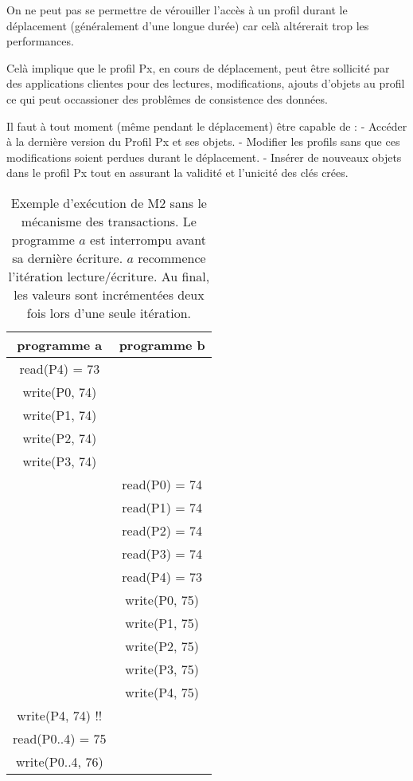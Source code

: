 \documentclass[a4paper,11pt]{article}
\begin{document}
On ne peut pas se permettre de vérouiller l'accès à un profil durant le déplacement (généralement d'une longue durée) car celà altérerait trop les performances.

Celà implique que le profil Px, en cours de déplacement, peut être sollicité par des applications clientes pour des lectures, modifications, ajouts d'objets au profil ce qui peut occassioner des problêmes de consistence des données.
 
Il faut à tout moment (même pendant le déplacement) être capable de :
- Accéder à la dernière version du Profil Px et ses objets.
- Modifier les profils sans que ces modifications soient perdues durant le déplacement.
- Insérer de nouveaux objets dans le profil Px tout en assurant la validité et l'unicité des clés crées.


\appendix

\begin{table}
\label{M2}
\caption{Exemple d'exécution de  M2  sans le mécanisme des transactions.
Le programme $a$ est interrompu avant sa dernière écriture. 
$a$ recommence l'itération lecture/écriture.
Au final, les valeurs sont incrémentées deux fois lors d'une seule itération.
}

\begin{center}
\begin{tabular}{|c|c|}
\hline 
programme a & programme b\tabularnewline
\hline 
\hline 
read(P4) = 73 & \tabularnewline
\hline 
write(P0, 74) & \tabularnewline
\hline 
write(P1, 74) & \tabularnewline
\hline 
write(P2, 74) & \tabularnewline
\hline 
write(P3, 74) & \tabularnewline
\hline 
 & read(P0) = 74\tabularnewline
\hline 
 & read(P1) = 74\tabularnewline
\hline 
 & read(P2) = 74\tabularnewline
\hline 
 & read(P3) = 74\tabularnewline
\hline 
 & read(P4) = 73\tabularnewline
\hline 
 & write(P0, 75)\tabularnewline
\hline 
 & write(P1, 75)\tabularnewline
\hline 
 & write(P2, 75)\tabularnewline
\hline 
 & write(P3, 75)\tabularnewline
\hline 
 & write(P4, 75)\tabularnewline
\hline 
write(P4, 74) !! & \tabularnewline
\hline 
read(P0..4) = 75 & \tabularnewline
\hline 
write(P0..4, 76) & \tabularnewline
\hline 
\end{tabular}
\end{center}
\end{table}
\end{document}
